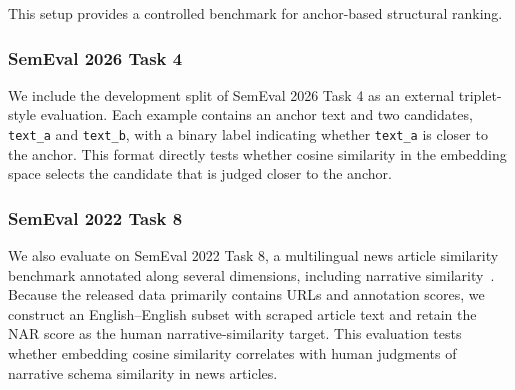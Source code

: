 This setup provides a controlled benchmark for anchor-based structural ranking.

\subsubsection{SemEval 2026 Task 4}

We include the development split of SemEval 2026 Task 4 as an external triplet-style evaluation. Each example contains an anchor text and two candidates, \texttt{text\_a} and \texttt{text\_b}, with a binary label indicating whether \texttt{text\_a} is closer to the anchor. This format directly tests whether cosine similarity in the embedding space selects the candidate that is judged closer to the anchor.

\subsubsection{SemEval 2022 Task 8}

We also evaluate on SemEval 2022 Task 8, a multilingual news article similarity benchmark annotated along several dimensions, including narrative similarity~\cite{chen2022semeval}. Because the released data primarily contains URLs and annotation scores, we construct an English--English subset with scraped article text and retain the \textsc{NAR} score as the human narrative-similarity target. This evaluation tests whether embedding cosine similarity correlates with human judgments of narrative schema similarity in news articles.
